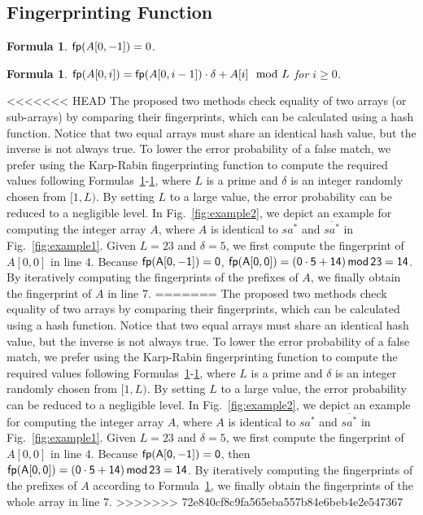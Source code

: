 \documentclass[10pt,journal,compsoc]{IEEEtran}
\newtheorem{formula}[theorem]{Formula}
\begin{document}
\subsection{Fingerprinting Function}

\begin{formula} \label{formula:1}${\sf fp}(A[0, -1]) = 0$.
\end{formula}

\begin{formula} \label{formula:2}${\sf fp}(A[0, i]) = {\sf fp}(A[0, i - 1]) \cdot {\delta} + A[i]\mod L$ for $i \ge 0$.
\end{formula}

<<<<<<< HEAD
The proposed two methods check equality of two arrays (or sub-arrays) by comparing their fingerprints, which can be calculated using a hash function. Notice that two equal arrays must share an identical hash value, but the inverse is not always true. To lower the error probability of a false match, we prefer using the Karp-Rabin fingerprinting function to compute the required values following Formulas~\ref{formula:1}-\ref{formula:2}, where $L$ is a prime and $\delta$ is an integer randomly chosen from $[1, L)$. By setting $L$ to a large value, the error probability can be reduced to a negligible level. In Fig.~\ref{fig:example2}, we depict an example for computing the integer array $A$, where $A$ is identical to $sa^*$ and $\overline{sa^*}$ in Fig.~\ref{fig:example1}. Given $L = 23$ and $\delta = 5$, we first compute the fingerprint of $A[0, 0]$ in line 4. Because $\sf fp(A[0, -1]) = 0$, $\sf fp(A[0, 0]) = (0 \cdot 5 + 14) \, mod \, 23 = 14$. By iteratively computing the fingerprints of the prefixes of $A$, we finally obtain the fingerprint of $A$ in line 7.
=======
The proposed two methods check equality of two arrays by comparing their fingerprints, which can be calculated using a hash function. Notice that two equal arrays must share an identical hash value, but the inverse is not always true. To lower the error probability of a false match, we prefer using the Karp-Rabin fingerprinting function to compute the required values following Formulas~\ref{formula:1}-\ref{formula:2}, where $L$ is a prime and $\delta$ is an integer randomly chosen from $[1, L)$. By setting $L$ to a large value, the error probability can be reduced to a negligible level. In Fig.~\ref{fig:example2}, we depict an example for computing the integer array $A$, where $A$ is identical to $sa^*$ and $\overline{sa^*}$ in Fig.~\ref{fig:example1}. Given $L = 23$ and $\delta = 5$, we first compute the fingerprint of $A[0, 0]$ in line 4. Because $\sf fp(A[0, -1]) = 0$, then $\sf fp(A[0, 0]) = (0 \cdot 5 + 14) \, mod \, 23 = 14$. By iteratively computing the fingerprints of the prefixes of $A$ according to Formula~\ref{formula:2}, we finally obtain the fingerprints of the whole array in line 7.
>>>>>>> 72e840cf8c9fa565eba557b84e6beb4e2e547367
\end{document}
